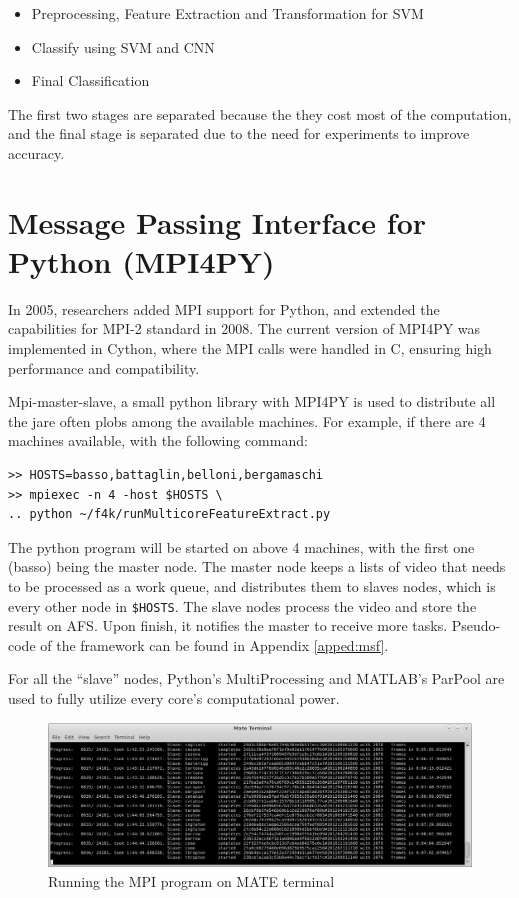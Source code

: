 \documentclass[bsc,logo,twoside,fullspacing,parskip]{infthesis}
\begin{document}
\begin{itemize}
   \setlength{\parskip}{3pt}
   \item Preprocessing, Feature Extraction and Transformation for SVM
   \item Classify using SVM and CNN
   \item Final Classification
\end{itemize}
The first two stages are separated because the they cost most of the computation, and the final stage is separated due to the need for experiments to improve accuracy.

\section{Message Passing Interface for Python (MPI4PY)}

In 2005, researchers added MPI support for Python\cite{MPI4PY}, and extended the capabilities for MPI-2 standard in 2008\cite{MPI4PY2}. The current version of MPI4PY\cite{MPI4PY3} was implemented in Cython, where the MPI calls were handled in C, ensuring high performance and compatibility.

Mpi-master-slave\cite{L5}, a small python library with MPI4PY is used to distribute all the jare often plobs among the available machines. 
For example, if there are 4 machines available, with the following command: 
\lstset{basicstyle=\footnotesize\ttfamily,breaklines=true}
\begin{lstlisting}[frame=single]
>> HOSTS=basso,battaglin,belloni,bergamaschi
>> mpiexec -n 4 -host $HOSTS \
.. python ~/f4k/runMulticoreFeatureExtract.py
\end{lstlisting}
The python program will be started on above 4 machines, with the first one (basso) being the master node.
The master node keeps a lists of video that needs to be processed as a work queue, and distributes them to slaves nodes, which is every other node in {\tt \$HOSTS}. 
The slave nodes process the video and store the result on AFS. Upon finish, it notifies the master to receive more tasks. Pseudo-code of the framework can be found in Appendix \ref{apped:msf}.

For all the ``slave'' nodes, Python's MultiProcessing and MATLAB's ParPool are used to fully utilize every core's computational power.

\begin{figure}
    \centering
    \includegraphics[scale=0.30]{graph/sample_terminal.png}
    \caption{Running the MPI program on MATE terminal}
    \label{fig:mpi}
\end{figure}
\end{document}
